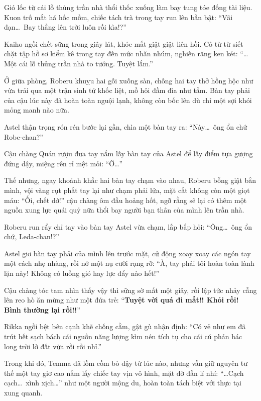 \documentclass[../main.tex]{subfiles}
\begin{document}

Gió lốc từ cái lỗ thủng trần nhà thổi thốc xuống làm bay tung tóe đống tài liệu. Kuon trố mắt há hốc mồm, chiếc tách trà trong tay run lên bần bật: ``Vãi đạn\dots\ Bay thẳng lên trời luôn rồi kìa!?''

Kaiho ngồi chết sững trong giây lát, khóe mắt giật giật liên hồi. Cô từ từ siết chặt tập hồ sơ kiểm kê trong tay đến mức nhăn nhúm, nghiến răng ken két: ``\dots Một cái lỗ thủng trần nhà to tướng. Tuyệt lắm.''

Ở giữa phòng, Roberu khuỵu hai gối xuống sàn, chống hai tay thở hồng hộc như vừa trải qua một trận sinh tử khốc liệt, mồ hôi đầm đìa như tắm. Bàn tay phải của cậu lúc này đã hoàn toàn nguội lạnh, không còn bốc lên dù chỉ một sợi khói mỏng manh nào nữa.

Astel thận trọng rón rén bước lại gần, chìa một bàn tay ra: ``Này\dots\ ông ổn chứ Robe-chan?''

Cậu chàng Quán rượu đưa tay nắm lấy bàn tay của Astel để lấy điểm tựa gượng đứng dậy, miệng rên rỉ mệt mỏi: ``Ờ\dots''

Thế nhưng, ngay khoảnh khắc hai bàn tay chạm vào nhau, Roberu bỗng giật bắn mình, vội vàng rụt phắt tay lại như chạm phải lửa, mặt cắt không còn một giọt máu: ``Ối, chết dở!'' cậu chàng ôm đầu hoảng hốt, ngỡ rằng sẽ lại có thêm một nguồn xung lực quái quỷ nữa thổi bay người bạn thân của mình lên trần nhà.

Roberu run rẩy chỉ tay vào bàn tay Astel vừa chạm, lắp bắp hỏi: ``Ông\dots\ ông ổn chứ, Leda-chan!?''

Astel giơ bàn tay phải của mình lên trước mặt, cử động xoay xoay các ngón tay một cách nhẹ nhàng, rồi nở một nụ cười rạng rỡ: ``À, tay phải tôi hoàn toàn lành lặn này! Không có luồng gió hay lực đẩy nào hết!''

Cậu chàng tóc tam nhìn thấy vậy thì sững sờ mất một giây, rồi lập tức nhảy cẫng lên reo hò ăn mừng như một đứa trẻ: ``\textbf{Tuyệt vời quá đi mất!! Khỏi rồi! Bình thường lại rồi!!}''


Rikka ngồi bệt bên cạnh khẽ chống cằm, gật gù nhận định: ``Có vẻ như em đã trút hết sạch bách cái nguồn năng lượng kìm nén tích tụ cho cái cú phản bác long trời lở đất vừa rồi rồi nhỉ.''

Trong khi đó, Temma đã lồm cồm bò dậy từ lúc nào, nhưng vẫn giữ nguyên tư thế một tay giơ cao nắm lấy chiếc tay vịn vô hình, mặt đờ đẫn lí nhí: ``\dots Cạch cạch\dots\ xình xịch\dots'' như một người mộng du, hoàn toàn tách biệt với thực tại xung quanh.
\end{document}
